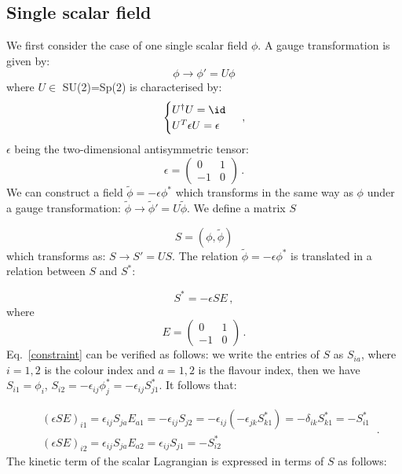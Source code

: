 \subsection{Single scalar field}


We first consider the case of one single scalar field $\phi$. A gauge transformation is given by:
%
\begin{equation}
\phi \to \phi' = U \phi
\end{equation}
%
where $U \in$ SU(2)=Sp(2) is characterised by: 
%
\begin{equation}
\begin{cases}
U^{\dagger}U = \id \\
U^{T}\epsilon U = \epsilon
\end{cases} \: ,
\end{equation}
%
$\epsilon$ being the two-dimensional antisymmetric tensor:
%
\begin{equation}
\epsilon =
\begin{pmatrix}
0 & 1 \\
-1 & 0
\end{pmatrix} \, .
\end{equation}
%
We can construct a field $\tilde{\phi}=-\epsilon \phi^*$ which transforms in the same way as $\phi$ under a gauge transformation:  $\tilde{\phi} \to \tilde{\phi}' = U \tilde{\phi}$.
%
We define a matrix $S$

\begin{equation}
S = (\phi, \tilde{\phi})
\label{S1}
\end{equation}
%
which transforms as: $S \to S'= US$.
The relation $\tilde{\phi}=-\epsilon \phi^*$ is translated in a relation between $S$ and $S^*$:

\begin{equation}
S^* = - \epsilon S E \, ,
\label{constraint}
\end{equation}
%
where
%
\begin{equation}
E =
\begin{pmatrix}
0 & 1 \\
-1 & 0
\end{pmatrix} \, .
\end{equation}
%
Eq.~\ref{constraint} can be verified as follows: we write the entries of $S$ as $S_{ia}$, where $i = 1,2$ is the colour index and $a = 1,2$ is the flavour index, then we have $S_{i1} = \phi_i$, $S_{i2} = - \epsilon_{ij} \phi^*_j = - \epsilon_{ij} S^*_{j1}$. It follows that:

\begin{equation}
\begin{split}
& (\epsilon S E)_{i1} = \epsilon_{ij} S_{ja} E_{a1} = - \epsilon_{ij} S_{j2} = -\epsilon_{ij} (- \epsilon_{jk} S_{k1}^*) = -\delta_{ik}S_{k1}^* = -S_{i1}^* \\
& (\epsilon S E)_{i2} = \epsilon_{ij} S_{ja} E_{a2} = \epsilon_{ij} S_{j1} = - S_{i2}^*
\end{split} \: .
\end{equation}
%
The kinetic term of the scalar Lagrangian is expressed in terms of $S$ as follows:

